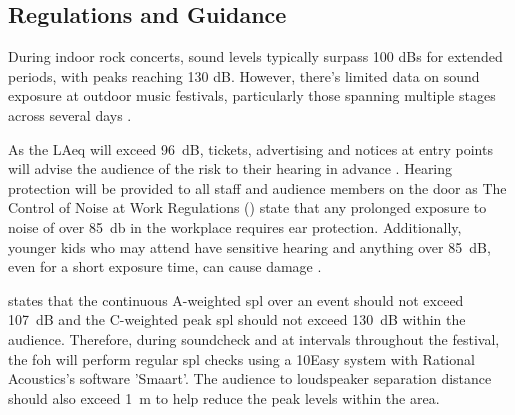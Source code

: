    \subsection{Regulations and Guidance}
        During indoor rock concerts, sound levels typically surpass 100 dBs for extended periods, with peaks reaching 130 dB. However, there's limited data on sound exposure at outdoor music festivals, particularly those spanning multiple stages across several days \citep{rmbrecht2023}.

        As the LAeq will exceed \SI{96}{\dB}, tickets, advertising and notices at entry points will advise the audience of the risk to their hearing in advance \citep{hse-event-safety-noise}. Hearing protection will be provided to all staff and audience members on the door as The Control of Noise at Work Regulations (\citeyear{hse2005}) state that any prolonged exposure to noise of over \SI{85}{\decibel} in the workplace requires ear protection. Additionally, younger kids who may attend have sensitive hearing and anything over \SI{85}{\dB}, even for a short exposure time, can cause damage \citep{rmbrecht2023}.

        \citet{hse-event-safety-noise} states that the continuous A-weighted \gls{spl} over an event should not exceed \SI{107}{\dB} and the C-weighted peak \gls{spl} should not exceed \SI{130}{\dB} within the audience. Therefore, during soundcheck and at intervals throughout the festival, the \gls{foh} will perform regular \gls{spl} checks using a 10Easy system with Rational Acoustics's software 'Smaart'. The audience to loudspeaker separation distance should also exceed \SI{1}{\metre} to help reduce the peak levels within the area.